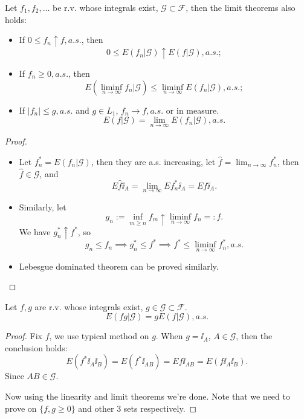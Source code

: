 \begin{theorem}
    Let $f_1,f_2,\dots$ be r.v. whose integrals exist,
	$\mathscr{G} \subset \mathscr{F}$, then the limit theorems also holds:
	\begin{itemize}
		\item If $0\le f_n\uparrow f, a.s.$, then
			\[
			0 \le E(f_n|\mathscr{G}) \uparrow E(f|\mathscr{G}), a.s.;
			\]
		\item If $f_n\ge 0, a.s.$, then
			\[
				E\left(\liminf_{n\to \infty} f_n | \mathscr{G}\right)
				\le \liminf_{n\to \infty}E(f_n|\mathscr{G}), a.s.;
			\]
		\item If $|f_n| \le g, a.s.$ and $g\in L_1$, $f_n \to f, a.s.$ or in measure.
			\[
			E(f|\mathscr{G}) = \lim_{n\to \infty} E(f_n|\mathscr{G}), a.s.
			\]
	\end{itemize}
\end{theorem}
\begin{proof}[Proof]
    \begin{itemize}
    	\item Let  $f_n^* = E(f_n|\mathscr{G})$, then they are a.s. increasing,
			let $\hat{f} = \lim_{n\to \infty} f_n^*$,
			then $\hat{f} \in \mathscr{G}$, and
			\[
			E\hat{f}\ii_A = \lim_{n\to \infty} Ef_n^*\ii_A = Ef\ii_A.
			\]
		\item Similarly, let
			\[
				g_n := \inf_{m\ge n}f_m \uparrow \liminf_{n\to \infty} f_n =: f.
			\]
			We have $g_n^* \uparrow f^*$, so
			\[
			g_n \le f_n \implies g_n^* \le f^* \implies f^* \le
			\liminf_{n\to \infty} f_n^*, a.s.
			\]
		\item Lebesgue dominated theorem can be proved similarly.
    \end{itemize}
\end{proof}

\begin{theorem}
    Let $f,g$ are r.v. whose integrals exist, $g\in \mathscr{G} \subset \mathscr{F}$.
	\[
	E(fg|\mathscr{G}) = gE(f|\mathscr{G}), a.s.
	\]
\end{theorem}
\begin{proof}[Proof]
    Fix $f$, we use typical method on $g$.
	When $g = \ii_A$, $A\in \mathscr{G}$, then the conclusion holds:
	\[
	E(f^*\ii_A \ii_B) = E(f^*\ii_{AB}) = Ef\ii_{AB} = E(f\ii_A\ii_B).
	\]
	Since $AB\in \mathscr{G}$.

	Now using the linearity and limit theorems we're done.
	Note that we need to prove on $\{f, g\ge 0\}$ and other 3 sets respectively.
\end{proof}

